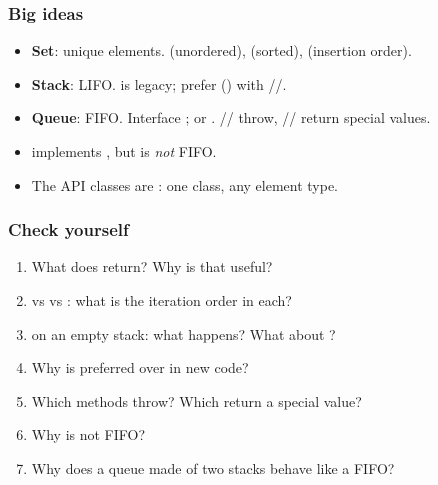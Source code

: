 \documentclass[aspectratio=169,10pt, compress]{beamer}
\begin{document}




\begin{frame}[t,fragile] \frametitle{Big ideas}
  \begin{itemize}
    \item \textbf{Set}: unique elements.  (unordered),
           (sorted),  (insertion order).
    \item \textbf{Stack}: LIFO.  is legacy;
          prefer  () with
          //.
    \item \textbf{Queue}: FIFO. Interface ;
           or .
          // throw,
          // return special values.
    \item {} implements , but is
          \emph{not} FIFO.
    \item The API classes are : one class, any element type.
  \end{itemize}
\end{frame}




\begin{frame}[t,fragile] \frametitle{Check yourself}
  \begin{enumerate}\small
    \item What does  return? Why is that useful?
    \item {} vs  vs :
          what is the iteration order in each?
    \item {} on an empty stack: what happens?
          What about ?
    \item Why is  preferred over  in new code?
    \item Which  methods throw? Which return a special value?
    \item Why is  not FIFO?
    \item Why does a queue made of two stacks behave like a FIFO?
  \end{enumerate}
\end{frame}
\end{document}
